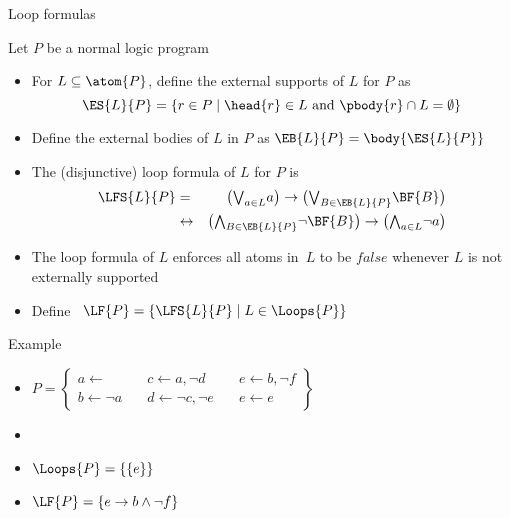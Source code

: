\begin{frame}{Loop formulas}

  Let $P$ be a normal logic program
  \begin{itemize}
  \item <1->
    For $L\subseteq\atom{P}$,
    define the \alert<1-2>{external supports} of $L$ for $P$ as
    \[
    \ES{L}{P}
    =
    \{  r\in P\mid\head{r}\in L\text{ and } \pbody{r}\cap L=\emptyset  \}
    \]
  \item<2-> Define the \alert{external bodies} of $L$ in $P$ as
    \(
    \EB{L}{P}=\body{\ES{L}{P}}
    \)
  \item<3->
    The (disjunctive) \alert{loop formula} of $L$ for $P$ is
    \begin{eqnarray*}
      \LFS{L}{P}
      & = &
      \big(
      \textstyle{\bigvee_{a\in L}} a
      \big)
      \rightarrow
      \big(
      \textstyle{\bigvee_{B\in\EB{L}{P}}}\BF{B}
      \big)
      \\
      & \leftrightarrow &
      \big(
      \textstyle{\bigwedge_{B\in\EB{L}{P}}}\neg \BF{B}
      \big)
      \rightarrow
      \big(
      \textstyle{\bigwedge_{a\in L}}\neg a
      \big)
    \end{eqnarray*}
  \item<4-> 
    The loop formula of $L$ enforces
    all atoms in~$L$ to be $\mathit{false}$
    whenever $L$ is not externally supported
  \item<4->
    Define \
    \(
    \LF{P} = \{  \LFS{L}{P} \mid L \in \Loops{P}  \}
    \)
  \end{itemize}
\end{frame}
\begin{frame}[c]{Example}
  \bigskip
  \begin{itemize}
  \item<1->
  \(
  P
  =
  \left\{
    \begin{array}{lll}
      a \leftarrow                  \quad &
      c \leftarrow a, \neg d       \quad &
      e \leftarrow b, \neg f
      \\
      b \leftarrow \neg a          \quad &
      d \leftarrow \neg c, \neg e \quad &
      e \leftarrow e
    \end{array}
  \right\}
  \)
  \bigskip
  \item<1-> []
    \begin{center}
    
    \end{center}
  \item<1-> $\Loops{P}=\{\{e\}\}$
  \item<2-> $\LF{P}=\{e\rightarrow b\wedge\neg f\}$
\end{itemize}
\end{frame}
